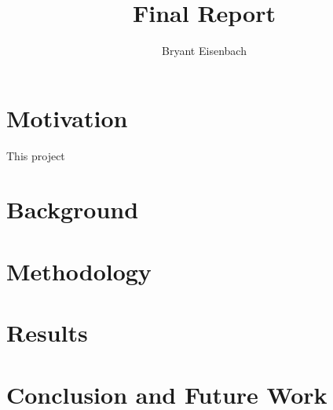 \documentclass[titlepage]{article}
\author{Bryant Eisenbach}
\title{\project Final Report}
\begin{document}
\section{Motivation}
This project


\section{Background}


\section{Methodology}


\section{Results}
%

\section{Conclusion and Future Work}
%
%

\pagebreak
{}

\end{document}
